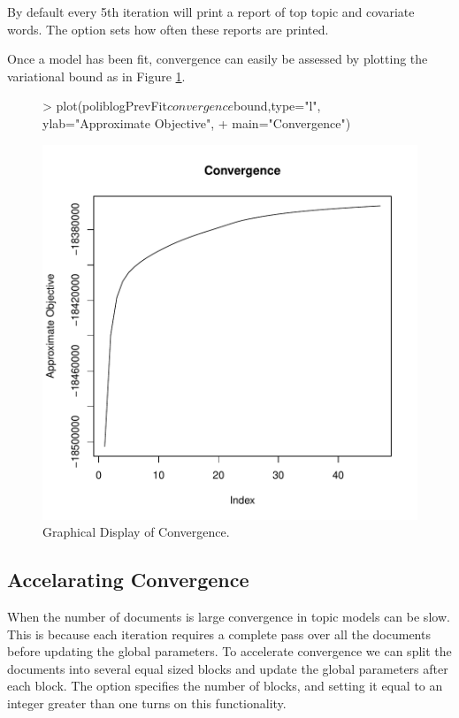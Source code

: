 \documentclass[nojss]{jss}
\begin{document}
By default every 5th iteration will print a report of top topic and covariate words.  The  option sets how often these reports are printed.

Once a model has been fit, convergence can easily be assessed by plotting the variational bound as in Figure \ref{fig:converge}. 

\begin{figure}[t!]
\begin{center}
\begin{Schunk}
\begin{Sinput}
> plot(poliblogPrevFit$convergence$bound,type="l", ylab="Approximate Objective",
+     main="Convergence")
\end{Sinput}
\end{Schunk}
\includegraphics{stmVignette-026}
\caption{Graphical Display of Convergence.}
\label{fig:converge}
\end{center}
\end{figure}

\subsection{Accelarating Convergence}
When the number of documents is large convergence in topic models can be slow.  This is because each iteration requires a complete pass over all the documents before updating the global parameters.  To accelerate convergence we can split the documents into several equal sized blocks and update the global parameters after each block.  The option  specifies the number of blocks, and setting it equal to an integer greater than one turns on this functionality. 
\end{document}
